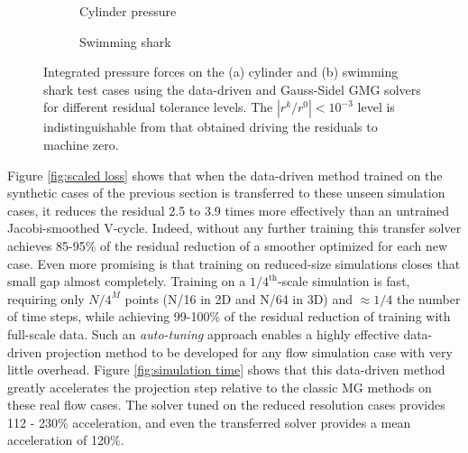 \documentclass[review]{elsarticle}
\begin{document}
\begin{figure}
    \centering
    \begin{subfigure}[b]{0.47\textwidth}
        \centering
        \caption{Cylinder pressure}
    \end{subfigure}
    \hfill
    \begin{subfigure}[b]{0.47\textwidth}
        \centering
        \caption{Swimming shark}
    \end{subfigure}
    \caption{Integrated pressure forces on the (a) cylinder and (b) swimming shark test cases using the data-driven and Gauss-Sidel GMG solvers for different residual tolerance levels. The $|r^k/r^0|<10^{-3}$ level is indistinguishable from that obtained driving the residuals to machine zero.}
    \label{fig:simulation forces}
\end{figure}

Figure \ref{fig:scaled loss} shows that when the data-driven method trained on the synthetic cases of the previous section is transferred to these unseen simulation cases, it reduces the residual 2.5 to 3.9 times more effectively than an untrained Jacobi-smoothed V-cycle. Indeed, without any further training this transfer solver achieves 85-95\% of the residual reduction of a smoother optimized for each new case. Even more promising is that training on reduced-size simulations closes that small gap almost completely. Training on a $1/4^\text{th}$-scale simulation is fast, requiring only $N/4^M$ points (N/16 in 2D and N/64 in 3D) and $\approx 1/4$ the number of time steps, while achieving 99-100\% of the residual reduction of training with full-scale data. Such an \textit{auto-tuning} approach enables a highly effective data-driven projection method to be developed for any flow simulation case with very little overhead. Figure \ref{fig:simulation time} shows that this data-driven method greatly accelerates the projection step relative to the classic MG methods on these real flow cases. The solver tuned on the reduced resolution cases provides 112 - 230\% acceleration, and even the transferred solver provides a mean acceleration of 120\%. 
\end{document}
